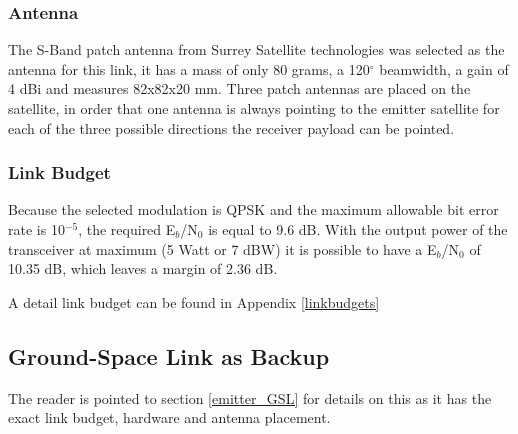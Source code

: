 \subsubsection{Antenna}
The S-Band patch antenna from Surrey Satellite technologies \cite{SurrPatch} was selected as the antenna for this link, it has a mass of only 80 grams, a 120$^{\circ}$ beamwidth, a gain of 4 dBi and measures 82x82x20 mm. Three patch antennas are placed on the satellite, in order that one antenna is always pointing to the emitter satellite for each of the three possible directions the receiver payload can be pointed.

\subsubsection{Link Budget}
Because the selected modulation is QPSK and the maximum allowable bit error rate is 10$^{-5}$, the required E$_{b}$/N$_{0}$ is equal to 9.6 dB. With the output power of the transceiver at maximum (5 Watt or 7 dBW) it is possible to have a E$_{b}$/N$_{0}$ of 10.35 dB, which leaves a margin of 2.36 dB.

A detail link budget can be found in Appendix \ref{linkbudgets}

\subsection{Ground-Space Link as Backup}
The reader is pointed to section \ref{emitter_GSL} for details on this as it has the exact link budget, hardware and antenna placement. 

